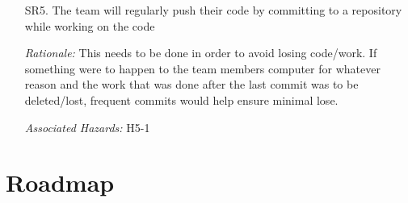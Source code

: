 \documentclass{article}
\begin{document}
\begin{enumerate}
    \item[SR5.] The team will regularly push their code by committing to a repository while working on the code\\
    \item[] \emph{Rationale:} This needs to be done in order to avoid losing code/work. If something were to happen to the team members computer for whatever reason and the work that was done after the last commit was to be deleted/lost, frequent commits would help ensure minimal lose.\\
    \item[] \emph{Associated Hazards:} H5-1 \\
    
\end{enumerate}


\section{Roadmap}

\end{document}
